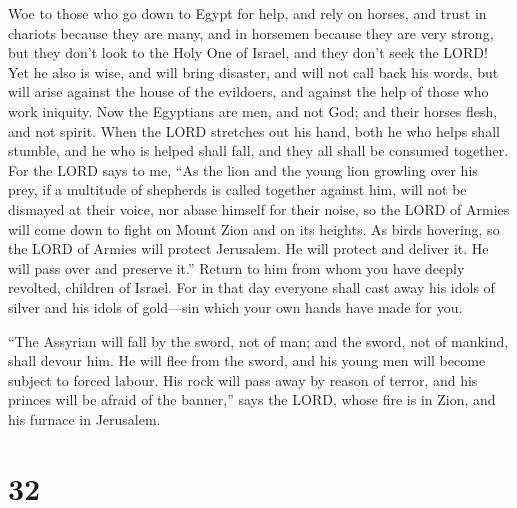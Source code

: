  Woe to those who go down to Egypt for help, and rely on
horses, and trust in chariots because they are many, and in horsemen
because they are very strong, but they don't look to the Holy One of
Israel, and they don't seek the LORD!  Yet he also is wise,
and will bring disaster, and will not call back his words, but will
arise against the house of the evildoers, and against the help of those
who work iniquity.  Now the Egyptians are men, and not God;
and their horses flesh, and not spirit. When the LORD stretches out his
hand, both he who helps shall stumble, and he who is helped shall fall,
and they all shall be consumed together.  For the LORD says
to me, ``As the lion and the young lion growling over his prey, if a
multitude of shepherds is called together against him, will not be
dismayed at their voice, nor abase himself for their noise, so the LORD
of Armies will come down to fight on Mount Zion and on its heights.
 As birds hovering, so the LORD of Armies will protect
Jerusalem. He will protect and deliver it. He will pass over and
preserve it.''  Return to him from whom you have deeply
revolted, children of Israel.  For in that day everyone
shall cast away his idols of silver and his idols of gold---sin which
your own hands have made for you.

 ``The Assyrian will fall by the sword, not of man; and the
sword, not of mankind, shall devour him. He will flee from the sword,
and his young men will become subject to forced labour.  His
rock will pass away by reason of terror, and his princes will be afraid
of the banner,'' says the LORD, whose fire is in Zion, and his furnace
in Jerusalem.

\hypertarget{section-31}{%
\section{32}\label{section-31}}

